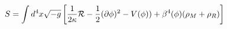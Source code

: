 \begin{equation}\label{action}
S=\int d^4x\sqrt{-g}\left[\frac{1}{2\kappa}{\cal
R}-\frac{1}{2}(\partial\phi)^2-
V(\phi))+\beta^4(\phi)(\rho_M+\rho_R)\right]
\end{equation}

